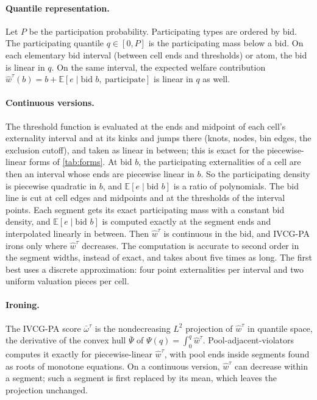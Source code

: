 \documentclass[11pt]{article}
\begin{document}
\paragraph{Quantile representation.} Let $P$ be the participation probability. Participating types are ordered by bid. The participating quantile $q\in[0,P]$ is the participating mass below a bid. On each elementary bid interval (between cell ends and thresholds) or atom, the bid is linear in $q$. On the same interval, the expected welfare contribution $\hat w^\tau(b)=b+\mathbb{E}[e\mid \text{bid } b,\ \text{participate}]$ is linear in $q$ as well.

\paragraph{Continuous versions.} The threshold function is evaluated at the ends and midpoint of each cell's externality interval and at its kinks and jumps there (knots, nodes, bin edges, the exclusion cutoff), and taken as linear in between; this is exact for the piecewise-linear forms of \cref{tab:forms}. At bid $b$, the participating externalities of a cell are then an interval whose ends are piecewise linear in $b$. So the participating density is piecewise quadratic in $b$, and $\mathbb{E}[e\mid\text{bid }b]$ is a ratio of polynomials. The bid line is cut at cell edges and midpoints and at the thresholds of the interval points. Each segment gets its exact participating mass with a constant bid density, and $\mathbb{E}[e\mid\text{bid }b]$ is computed exactly at the segment ends and interpolated linearly in between. Then $\hat w^\tau$ is continuous in the bid, and IVCG-PA irons only where $\hat w^\tau$ decreases. The computation is accurate to second order in the segment widths, instead of exact, and takes about five times as long. The first best uses a discrete approximation: four point externalities per interval and two uniform valuation pieces per cell.

\paragraph{Ironing.} The IVCG-PA score $\bar\omega^\tau$ is the nondecreasing $L^2$ projection \citep{myerson_optimal_1981} of $\hat w^\tau$ in quantile space, the derivative of the convex hull $\bar\Psi$ of $\Psi(q)=\int_0^q\hat w^\tau$. Pool-adjacent-violators computes it exactly for piecewise-linear $\hat w^\tau$, with pool ends inside segments found as roots of monotone equations. On a continuous version, $\hat w^\tau$ can decrease within a segment; such a segment is first replaced by its mean, which leaves the projection unchanged.
\end{document}
